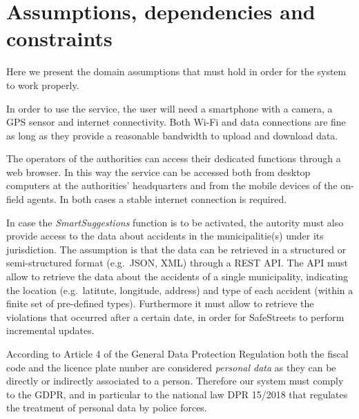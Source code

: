 \section{Assumptions, dependencies and constraints}
\label{sec:ass_deps_constr}

Here we present the domain assumptions that must hold in order for the system
to work properly.
\begin{description}
\end{description}

In order to use the service, the user will need a smartphone with a camera,
a GPS sensor and internet connectivity. Both Wi-Fi and data connections are fine
as long as they provide a reasonable bandwidth to upload and download data.

The operators of the authorities can access their dedicated functions through
a web browser. In this way the service can be accessed both from desktop
computers at the authorities' headquarters and from the mobile devices of the
on-field agents. In both cases a stable internet connection is required.

In case the \emph{SmartSuggestions} function is to be activated, the autority
must also provide access to the data about accidents in the municipalitie(s)
under its jurisdiction.
The assumption is that the data can be retrieved in a structured or
semi-structured format (e.g.\ JSON, XML) through a REST API.
The API must allow to retrieve the data about the accidents of a single
municipality, indicating the location (e.g.\ latitute, longitude, address) and
type of each accident (within a finite set of pre-defined types).
Furthermore it must allow to retrieve the violations that occurred after a
certain date, in order for SafeStreets to perform incremental updates.

According to Article 4 of the General Data Protection Regulation
\cite{gdpr:article-4-definitions} both the fiscal code and the licence plate
nunber are considered \emph{personal data} as they can be directly or indirectly
associated to a person. Therefore our system must comply to the GDPR, and in
particular to the national law DPR 15/2018 \cite{gu:dpr-15/2018} that regulates
the treatment of personal data by police forces.